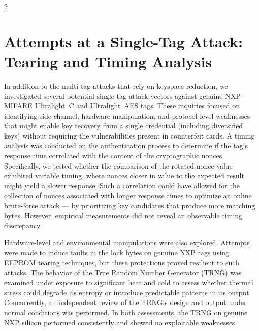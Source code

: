 \documentclass[10pt,letterpaper]{article}
\begin{document}
\begin{multicols}{2}
\section{Attempts at a Single-Tag Attack: Tearing and Timing Analysis}
\label{sec:attempt1card}
In addition to the multi-tag attacks that rely on keyspace reduction, we investigated several potential single-tag attack vectors against genuine NXP MIFARE Ultralight~C and Ultralight~AES tags. These inquiries focused on identifying side-channel, hardware manipulation, and protocol-level weaknesses that might enable key recovery from a single credential (including diversified keys) without requiring the vulnerabilities present in counterfeit cards. A timing analysis was conducted on the authentication process to determine if the tag's response time correlated with the content of the cryptographic nonces. Specifically, we tested whether the comparison of the rotated nonce value exhibited variable timing, where nonces closer in value to the expected result might yield a slower response. Such a correlation could have allowed for the collection of nonces associated with longer response times to optimize an online brute-force attack --- by prioritizing key candidates that produce more matching bytes. However, empirical measurements did not reveal an observable timing discrepancy.

Hardware-level and environmental manipulations were also explored. Attempts were made to induce faults in the lock bytes on genuine NXP tags using EEPROM tearing techniques, but these protections proved resilient to such attacks. The behavior of the True Random Number Generator (TRNG) was examined under exposure to significant heat and cold to assess whether thermal stress could degrade its entropy or introduce predictable patterns in its output. Concurrently, an independent review of the TRNG's design and output under normal conditions was performed. In both assessments, the TRNG on genuine NXP silicon performed consistently and showed no exploitable weaknesses.


\end{multicols}
\end{document}
